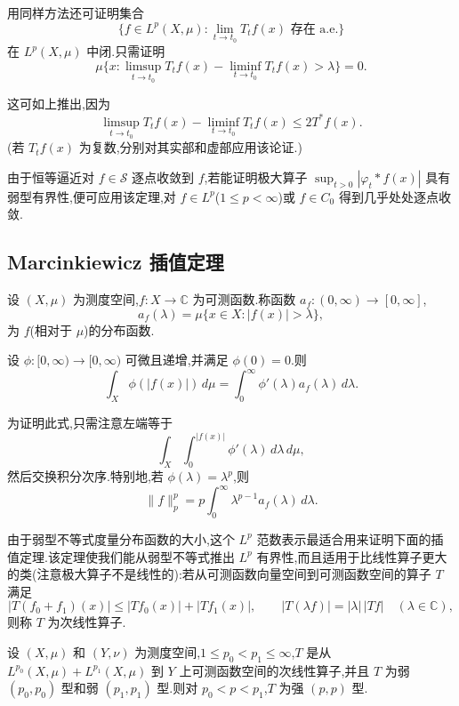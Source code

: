 用同样方法还可证明集合
\[
 \{f\in L^p(X,\mu):\lim_{t\to t_0}T_tf(x)\text{ 存在 a.e.}\}
\]
在 $L^p(X,\mu)$ 中闭.只需证明
\[
 \mu\{x:\limsup_{t\to t_0}T_tf(x)-\liminf_{t\to t_0}T_tf(x)>\lambda\}=0.
\]

\hypertarget{sample-page-040}{}
这可如上推出,因为
\[
 \limsup_{t\to t_0}T_tf(x)-\liminf_{t\to t_0}T_tf(x)\le2T^*f(x).
\]
(若 $T_tf(x)$ 为复数,分别对其实部和虚部应用该论证.)

由于恒等逼近对 $f\in\mathcal S$ 逐点收敛到 $f$,若能证明极大算子 $\sup_{t>0}|\varphi_t*f(x)|$ 具有弱型有界性,便可应用该定理,对 $f\in L^p$($1\le p<\infty$)或 $f\in C_0$ 得到几乎处处逐点收敛.

\subsection{Marcinkiewicz 插值定理}
\label{sec:ch2-marcinkiewicz-interpolation}

设 $(X,\mu)$ 为测度空间,$f:X\to\mathbb C$ 为可测函数.称函数 $a_f:(0,\infty)\to[0,\infty]$,
\[
 a_f(\lambda)=\mu\{x\in X:|f(x)|>\lambda\},
\]
为 $f$(相对于 $\mu$)的分布函数.

\begin{Proposition}
\label{prop:ch2-distribution-function-integral}
设 $\phi:[0,\infty)\to[0,\infty)$ 可微且递增,并满足 $\phi(0)=0$.则
\[
 \int_X\phi(|f(x)|)\,d\mu=\int_0^\infty\phi'(\lambda)a_f(\lambda)\,d\lambda.
\]
\end{Proposition}
为证明此式,只需注意左端等于
\[
 \int_X\int_0^{|f(x)|}\phi'(\lambda)\,d\lambda\,d\mu,
\]
然后交换积分次序.特别地,若 $\phi(\lambda)=\lambda^p$,则
\begin{equation}
\label{eq:ch2-distribution-layer-cake}
 \|f\|_p^p=p\int_0^\infty\lambda^{p-1}a_f(\lambda)\,d\lambda.
\end{equation}

由于弱型不等式度量分布函数的大小,这个 $L^p$ 范数表示最适合用来证明下面的插值定理.该定理使我们能从弱型不等式推出 $L^p$ 有界性,而且适用于比线性算子更大的类(注意极大算子不是线性的):若从可测函数向量空间到可测函数空间的算子 $T$ 满足
\[
 |T(f_0+f_1)(x)|\le|Tf_0(x)|+|Tf_1(x)|,
 \qquad |T(\lambda f)|=|\lambda|\,|Tf|\quad(\lambda\in\mathbb C),
\]
则称 $T$ 为次线性算子.

\hypertarget{sample-page-041}{}
\begin{Theorem}[Marcinkiewicz 插值]
\label{thm:ch2-marcinkiewicz-interpolation}
设 $(X,\mu)$ 和 $(Y,\nu)$ 为测度空间,$1\le p_0<p_1\le\infty$,$T$ 是从 $L^{p_0}(X,\mu)+L^{p_1}(X,\mu)$ 到 $Y$ 上可测函数空间的次线性算子,并且 $T$ 为弱 $(p_0,p_0)$ 型和弱 $(p_1,p_1)$ 型.则对 $p_0<p<p_1$,$T$ 为强 $(p,p)$ 型.
\end{Theorem}

